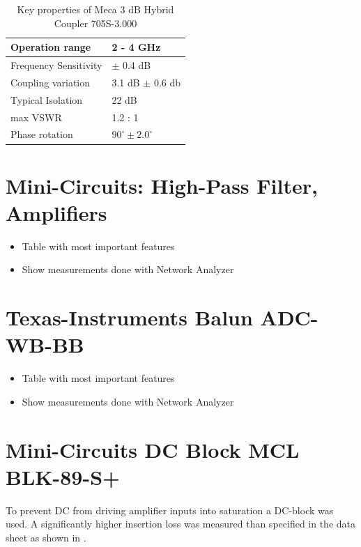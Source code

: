 \begin{table}[h]
  \centering
  \begin{tabular}{|l|l|}
    \hline
    Operation range & 2 - 4 GHz \\ \hline
    Frequency Sensitivity & $\pm$ 0.4 dB \\ \hline
    Coupling variation & 3.1 dB $\pm$ 0.6 db \\ \hline
    Typical Isolation & 22 dB \\ \hline
    max \gls{VSWR} & 1.2 : 1 \\ \hline
    Phase rotation & $90^\circ \pm 2.0^\circ$ \\ \hline
  \end{tabular}
  \caption{Key properties of Meca 3 dB Hybrid Coupler 705S-3.000}
  \label{tab:awg}
\end{table}


\section{Mini-Circuits: High-Pass Filter, Amplifiers}
\begin{itemize}
\item Table with most important features
\item Show measurements done with Network Analyzer
\end{itemize}

\section{Texas-Instruments Balun ADC-WB-BB}
\begin{itemize}
\item Table with most important features
\item Show measurements done with Network Analyzer
\end{itemize}

\section{Mini-Circuits DC Block MCL BLK-89-S+}
\label{sec:comp_dc_block}
To prevent \gls{DC} from driving amplifier inputs into saturation
a \gls{DC}-block was used. A significantly higher insertion loss was
measured than specified in the data sheet as shown in
.

